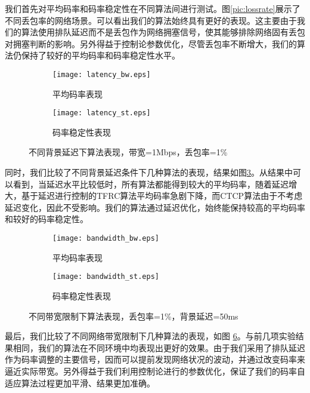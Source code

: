         我们首先对平均码率和码率稳定性在不同算法间进行测试。图\ref{pic:lossrate}展示了不同丢包率的网络场景。可以看出我们的算法始终具有更好的表现。这主要由于我们的算法使用排队延迟而不是丢包作为网络拥塞信号，使其能够排除网络固有丢包对拥塞判断的影响。另外得益于控制论参数优化，尽管丢包率不断增大，我们的算法仍保持了较好的平均码率和码率稳定性水平。

        \begin{figure}[htbp]
          \begin{subfigure}[b]{0.5\textwidth}
            \centering
            \texttt{[image: latency\_bw.eps]}
            \caption{平均码率表现}
            \label{pic:latency_bw}
          \end{subfigure}
          \begin{subfigure}[b]{0.5\textwidth}
            \centering
            \texttt{[image: latency\_st.eps]}
            \caption{码率稳定性表现}
            \label{pic:latency_st}
          \end{subfigure}
          \caption{不同背景延迟下算法表现，带宽=1Mbps，丢包率=1\%}
          \label{pic:latency}
        \end{figure}

        同时，我们比较了不同背景延迟条件下几种算法的表现，结果如图\ref{pic:latency}。从结果中可以看到，当延迟水平比较低时，所有算法都能得到较大的平均码率，随着延迟增大，基于延迟进行控制的TFRC算法平均码率急剧下降，而CTCP算法由于不考虑延迟变化，因此不受影响。我们的算法通过延迟优化，始终能保持较高的平均码率和较好的码率稳定性。

        \begin{figure}[htbp]
          \begin{subfigure}[b]{0.5\textwidth}
            \centering
            \texttt{[image: bandwidth\_bw.eps]}
            \caption{平均码率表现}
            \label{pic:bandwidth_bw}
          \end{subfigure}
          \begin{subfigure}[b]{0.5\textwidth}
            \centering
            \texttt{[image: bandwidth\_st.eps]}
            \caption{码率稳定性表现}
            \label{pic:bandwidth_st}
          \end{subfigure}
          \caption{不同带宽限制下算法表现，丢包率=1\%，背景延迟=50ms}
          \label{pic:bandwidth}
        \end{figure}

        最后，我们比较了不同网络带宽限制下几种算法的表现，如图 \ref{pic:bandwidth}。与前几项实验结果相同，我们的算法在不同环境中均表现出更好的效果。由于我们采用了排队延迟作为码率调整的主要信号，因而可以提前发现网络状况的波动，并通过改变码率来逼近实际带宽。另外得益于我们利用控制论进行的参数优化，保证了我们的码率自适应算法过程更加平滑、结果更加准确。

